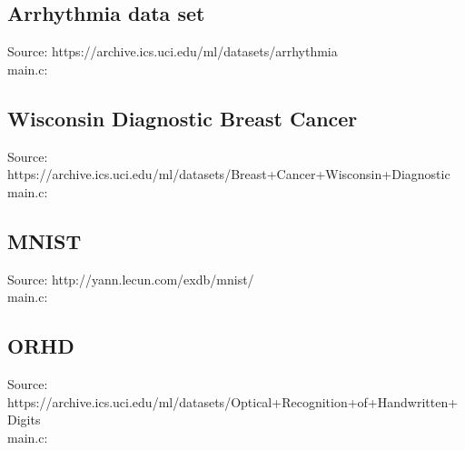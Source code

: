 \subsection{Arrhythmia data set}

Source: https://archive.ics.uci.edu/ml/datasets/arrhythmia \\

main.c:\\
\begin{scriptsize}
\begin{ttfamily}

\end{ttfamily}
\end{scriptsize}

\subsection{Wisconsin Diagnostic Breast Cancer}

Source: https://archive.ics.uci.edu/ml/datasets/Breast+Cancer+Wisconsin+Diagnostic \\

main.c:\\
\begin{scriptsize}
\begin{ttfamily}

\end{ttfamily}
\end{scriptsize}

\subsection{MNIST}

Source: http://yann.lecun.com/exdb/mnist/ \\

main.c:\\
\begin{scriptsize}
\begin{ttfamily}

\end{ttfamily}
\end{scriptsize}

\subsection{ORHD}

Source: https://archive.ics.uci.edu/ml/datasets/Optical+Recognition+of+Handwritten+Digits \\

main.c:\\
\begin{scriptsize}
\begin{ttfamily}

\end{ttfamily}
\end{scriptsize}

